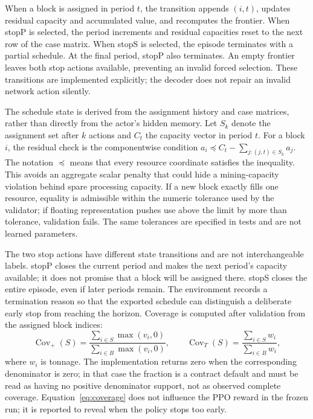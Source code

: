 \documentclass[11pt]{article}
\begin{document}
When a block is assigned in period $t$, the transition appends $(i,t)$, updates residual capacity and accumulated value, and recomputes the frontier. When stopP is selected, the period increments and residual capacities reset to the next row of the case matrix. When stopS is selected, the episode terminates with a partial schedule. At the final period, stopP also terminates. An empty frontier leaves both stop actions available, preventing an invalid forced selection. These transitions are implemented explicitly; the decoder does not repair an invalid network action silently.

The schedule state is derived from the assignment history and case matrices, rather than directly from the actor's hidden memory. Let $S_k$ denote the assignment set after $k$ actions and $C_t$ the capacity vector in period $t$. For a block $i$, the residual check is the componentwise condition $a_i\preceq C_t-\sum_{j:(j,t)\in S_k}a_j$. The notation $\preceq$ means that every resource coordinate satisfies the inequality. This avoids an aggregate scalar penalty that could hide a mining-capacity violation behind spare processing capacity. If a new block exactly fills one resource, equality is admissible within the numeric tolerance used by the validator; if floating representation pushes use above the limit by more than tolerance, validation fails. The same tolerances are specified in tests and are not learned parameters.

The two stop actions have different state transitions and are not interchangeable labels. stopP closes the current period and makes the next period's capacity available; it does not promise that a block will be assigned there. stopS closes the entire episode, even if later periods remain. The environment records a termination reason so that the exported schedule can distinguish a deliberate early stop from reaching the horizon. Coverage is computed after validation from the assigned block indices:
\begin{equation}
\operatorname{Cov}_{+}(S)=\frac{\sum_{i\in S}\max(v_i,0)}{\sum_{i\in B}\max(v_i,0)},\qquad
\operatorname{Cov}_{T}(S)=\frac{\sum_{i\in S}w_i}{\sum_{i\in B}w_i},
\label{eq:coverage}
\end{equation}
where $w_i$ is tonnage. The implementation returns zero when the corresponding denominator is zero; in that case the fraction is a contract default and must be read as having no positive denominator support, not as observed complete coverage. Equation~\ref{eq:coverage} does not influence the PPO reward in the frozen run; it is reported to reveal when the policy stops too early.
\end{document}
